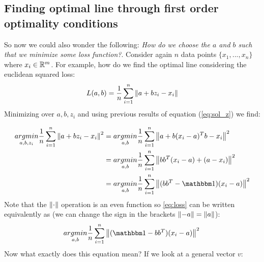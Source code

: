 			\subsection{Finding optimal line through first order optimality conditions}
			So now we could also wonder the following: \textit{How do we choose the $a$ and $b$ such that we minimize some loss function?}. Consider again $n$ data points $\{x_1,...,x_n\}$ where $x_i \in \mathbb{R}^m$. For example, how do we find the optimal line considering the euclidean squared loss:
			\begin{equation}
				L(a,b) = \frac{1}{n}\sum_{i=1}^{n}\left\lVert a + bz_i - x_i\right\rVert
			\end{equation}
			Minimizing over $a,b,z_i$ and using previous results of equation (\ref{eq:sol_z}) we find:
			
			\begin{equation}
			\label{eq:loss}
				\begin{split}
					\underset{a,b,z_i}{argmin}\frac{1}{n}\sum_{i=1}^{n}\norm{a + bz_i - x_i}^2 &= \underset{a,b}{argmin}\frac{1}{n}\sum_{i=1}^{n}\norm{a + b(x_i - a)^Tb - x_i}^2\\
					&= \underset{a,b}{argmin}\frac{1}{n}\sum_{i=1}^{n}\norm{bb^T(x_i - a) + (a - x_i)}^2 \\
					&= \underset{a,b}{argmin}\frac{1}{n}\sum_{i=1}^{n}\norm{(bb^T - \ID)(x_i - a)}^2 \\
				\end{split}
			\end{equation}
			Note that the $\left\lVert\cdot\right\rVert$ operation is an even function so \ref{eq:loss} can be written equivalently as (we can change the sign in the brackets $\left\lVert-a\right\rVert = \left\lVert a\right\rVert$):
			\begin{equation}
				\underset{a,b}{argmin}\frac{1}{n}\sum_{i=1}^{n}\norm{(\ID - bb^T)(x_i - a)}^2 \\
			\end{equation}
			Now what exactly does this equation mean? If we look at a general vector $v$:
			
